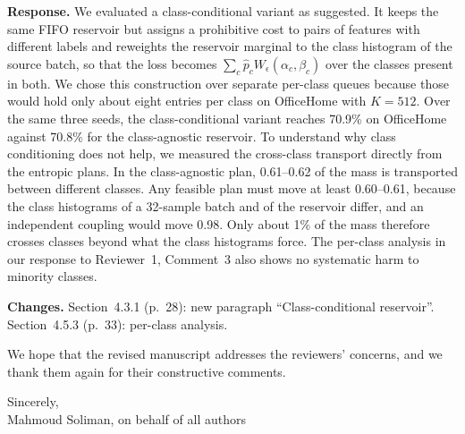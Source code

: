 \documentclass[11pt]{article}
\newcommand{\resp}{\noindent\textbf{Response.} }
\newcommand{\chg}{\noindent\textbf{Changes.} }
\begin{document}
\resp We evaluated a class-conditional variant as suggested. It keeps the same FIFO reservoir but assigns a prohibitive cost to pairs of features with different labels and reweights the reservoir marginal to the class histogram of the source batch, so that the loss becomes $\sum_c\hat p_cW_\epsilon(\alpha_c,\beta_c)$ over the classes present in both. We chose this construction over separate per-class queues because those would hold only about eight entries per class on OfficeHome with $K=512$. Over the same three seeds, the class-conditional variant reaches 70.9\% on OfficeHome against 70.8\% for the class-agnostic reservoir. To understand why class conditioning does not help, we measured the cross-class transport directly from the entropic plans. In the class-agnostic plan, 0.61--0.62 of the mass is transported between different classes. Any feasible plan must move at least 0.60--0.61, because the class histograms of a 32-sample batch and of the reservoir differ, and an independent coupling would move 0.98. Only about 1\% of the mass therefore crosses classes beyond what the class histograms force. The per-class analysis in our response to Reviewer~1, Comment~3 also shows no systematic harm to minority classes.

\chg Section~4.3.1 (p.~28): new paragraph ``Class-conditional reservoir''. Section~4.5.3 (p.~33): per-class analysis.

\bigskip
\noindent We hope that the revised manuscript addresses the reviewers' concerns, and we thank them again for their constructive comments.

\medskip
\noindent Sincerely,\\
Mahmoud Soliman, on behalf of all authors
\end{document}
